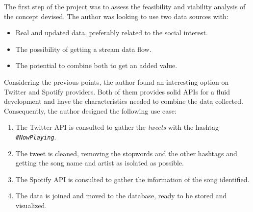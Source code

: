 

\nonzeroparskip The first step of the project was to assess the feasibility and viability analysis of the concept devised. The author was looking to use two data sources with:

\begin{itemize}
	\item Real and updated data, preferably related to the social interest.
	\item The possibility of getting a stream data flow.
	\item The potential to combine both to get an added value.
\end{itemize}

\nonzeroparskip Considering the previous points, the author found an interesting option on Twitter and Spotify providers. Both of them provides solid APIs for a fluid development and have the characteristics needed to combine the data collected. Consequently, the author designed the following use case:

\begin{enumerate}
	\item The Twitter API is consulted to gather the \textit{tweets} with the hashtag \texttt{\textit{\#NowPlaying}}.
	\item The tweet is cleaned, removing the stopwords and the other hashtags and getting the song name and artist as isolated as possible.
	\item The Spotify API is consulted to gather the information of the song identified.
	\item The data is joined and moved to the database, ready to be stored and visualized.
\end{enumerate}

